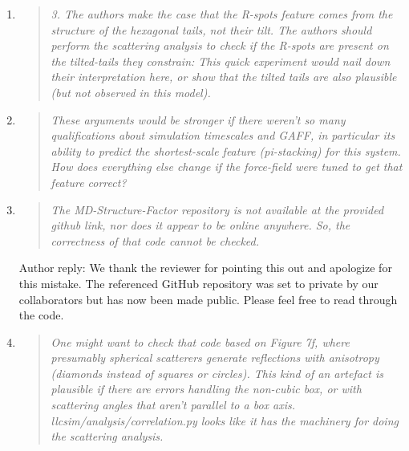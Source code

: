 \documentclass{article}
\begin{document}
\begin{enumerate}
    
	\item \begin{quote}
    \textit{3. The authors make the case that the R-spots feature comes from the structure of the hexagonal
    tails, not their tilt. The authors should perform the scattering analysis to check if the R-spots are
    present on the tilted-tails they constrain: This quick experiment would nail down their interpretation
    here, or show that the tilted tails are also plausible (but not observed in this model).}
    \end{quote}
    
    \item \begin{quote}
    \textit{These arguments would be stronger if there weren't so many qualifications about simulation 
    timescales and GAFF, in particular its ability to predict the shortest-scale feature (pi-stacking) for 
    this system. How does everything else change if the force-field were tuned to get that feature correct?}
    \end{quote}

	\item \begin{quote}
    \textit{The MD-Structure-Factor repository is not available at the provided github link, nor does it appear
    to be online anywhere. So, the correctness of that code cannot be checked.}
	\end{quote}
    
	Author reply: We thank the reviewer for pointing this out and apologize for this mistake. The referenced
	GitHub repository was set to private by our collaborators but has now been made public. Please feel 
	free to read through the code. 
    
    \item \begin{quote}
    \textit{One might want to check that code based on Figure 7f, where presumably spherical scatterers 
    generate reflections with anisotropy (diamonds instead of squares or circles). This kind of an artefact
    is plausible if there are errors handling the non-cubic box, or with scattering angles that aren't parallel
    to a box axis. llcsim/analysis/correlation.py looks like it has the machinery for doing the scattering analysis.}
	\end{quote}
	

\end{enumerate}
\end{document}
